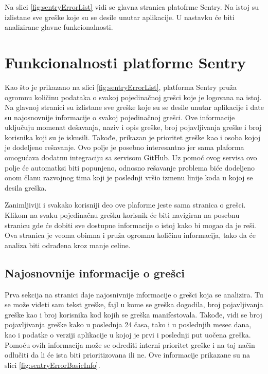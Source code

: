 \documentclass[12pt,oneside]{memoir}
\begin{document}
Na slici \ref{fig:sentryErrorList} vidi se glavna stranica platofrme Sentry. Na istoj su izlistane sve greške koje su se desile unutar aplikacije. U nastavku će biti analizirane glavne funkcionalnosti.

\section{Funkcionalnosti platforme Sentry}

Kao što je prikazano na slici \ref{fig:sentryErrorList}, platforma Sentry pruža ogromnu količinu podataka o svakoj pojedinačnoj grešci koje je logovana na istoj. Na glavnoj stranici su izlistane sve greške koje su se desile unutar aplikacije i date su najosnovnije informacije o svakoj pojedinačnoj grešci. Ove informacije uključuju momenat dešavanja, naziv i opis greške, broj pojavljivanja greške i broj korisnika koji su je iskusili. Takođe, prikazan je prioritet greške kao i osoba kojoj je dodeljeno rešavanje. Ovo polje je posebno interesantno jer sama plaforma omogućava dodatnu integraciju sa servisom GitHub. Uz pomoć ovog servisa ovo polje će automatksi biti popunjeno, odnosno rešavanje problema biće dodeljeno onom članu razvojnog tima koji je poslednji vršio izmenu linije koda u kojoj se desila greška. \newline

Zanimljiviji i svakako korisniji deo ove plaforme jeste sama stranica o grešci. Klikom na svaku pojedinačnu grešku korisnik će biti navigiran na posebnu stranicu gde će dobiti sve dostupne informacije o istoj kako bi mogao da je reši. Ova stranica je veoma obimna i pruža ogromnu količinu informacija, tako da će analiza biti odrađena kroz manje celine.

\subsection{Najosnovnije informacije o grešci}

Prva sekcija na stranici daje najosnivnije informacije o grešci koja se analizira. Tu se može videti sam tekst greške, fajl u kome se greška dogodila, broj pojavljivanja greške kao i broj korisnika kod kojih se greška manifestovala. Takođe, vidi se broj pojavljivanja greške kako u poslednja 24 časa, tako i u poslednjih mesec dana, kao i podatke o verziji aplikacije u kojoj je prvi i poslednji put uočena greška. Pomoću ovih informacija može se odrediti interni prioritet greške i na taj način odlučiti da li će ista biti prioritizovana ili ne. Ove informacije prikazane su na slici \ref{fig:sentryErrorBasicInfo}.
\end{document}
